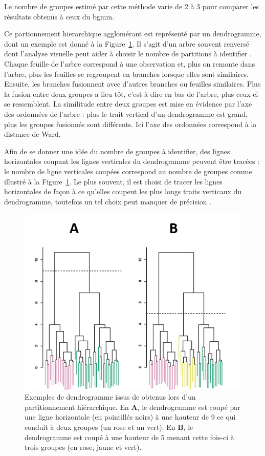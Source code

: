 Le nombre de groupes estimé par cette méthode varie de 2 à 3 pour comparer les résultats obtenus à ceux du \gls{bgmm}. 

Ce partionnement hierarchique agglomérant est représenté par un dendrogramme, dont un exemple est donné à la 
Figure~\ref{Figure:tbr_dendrogram_example}. Il s'agit d'un arbre souvent renversé dont l'analyse visuelle 
peut aider à choisir le nombre de partitions à identifier \citep[Chapitre~10]{James2013}.
Chaque feuille de l'arbre correspond à une observation et, plus on remonte dans l'arbre, plus les feuilles se regroupent en branches lorsque elles 
sont similaires. Ensuite, les branches fusionnent avec d'autres branches ou feuilles similaires. Plus la fusion entre deux groupes a lieu tôt, c'est à dire en bas de
l'arbre, plus ceux-ci se ressemblent. La similitude entre deux groupes est mise en évidence par l'axe des ordonnées de l'arbre :
plus le trait vertical d'un dendrogramme est grand, plus les groupes fusionnés sont différents. Ici l'axe des ordonnées correspond à la distance de Ward.

Afin de se donner une idée du nombre de groupes à identifier, des lignes horizontales coupant les lignes verticales du dendrogramme peuvent être
tracées : le nombre de ligne verticales coupées correspond au nombre de groupes comme illustré à la Figure~\ref{Figure:tbr_dendrogram_example}.
Le plus souvent, il est choisi de tracer les lignes horizontales de façon à ce qu'elles coupent les plus longs traits verticaux du dendrogramme, 
toutefois un tel choix peut manquer de précision \citep[Chapitre~10]{James2013}.

\begin{figure}[h!]
  \centering
	\includegraphics[width=0.7\linewidth]{figures/chapter-4/tbr-dendrogram-example} 
  \caption{Exemples de dendrogramme issus de \citet[Chapitre~10]{James2013} obtenus lors d'un partitionnement hiérarchique. En \textbf{A}, le dendrogramme est coupé
	par une ligne horizontale (en pointillés noirs) à une hauteur de 9 ce qui conduit à deux groupes (un rose et un vert). En \textbf{B}, le dendrogramme
	est coupé à une hauteur de 5 menant cette fois-ci à trois groupes (en rose, jaune et vert).} 
	\label{Figure:tbr_dendrogram_example} 
\end{figure}

